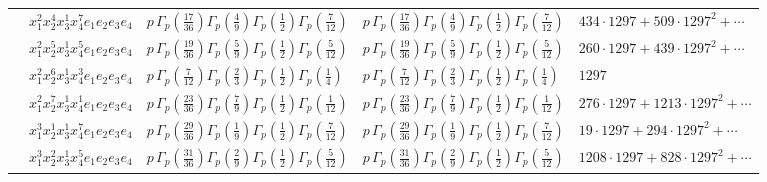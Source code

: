 \documentclass[11pt]{article}
\begin{document}
\begin{table}[ht]
{\begin{tabular}{@{}lllll@{}}
 & $x_{1}^{2} x_{2}^{4} x_{3}^{1} x_{4}^{7}  e_{1} e_{2} e_{3} e_{4}$ & $p \, \Gamma_p \left( \frac{17}{36} \right) \Gamma_p \left( \frac{4}{9} \right) \Gamma_p \left( \frac{1}{2} \right) \Gamma_p \left( \frac{7}{12} \right)$ & $p \, \Gamma_p \left( \frac{17}{36} \right) \Gamma_p \left( \frac{4}{9} \right) \Gamma_p \left( \frac{1}{2} \right) \Gamma_p \left( \frac{7}{12} \right)$ & $434{\cdot}1297{+}509{\cdot}1297^{2}{+}\cdots$ \\
 & $x_{1}^{2} x_{2}^{5} x_{3}^{1} x_{4}^{5}  e_{1} e_{2} e_{3} e_{4}$ & $p \, \Gamma_p \left( \frac{19}{36} \right) \Gamma_p \left( \frac{5}{9} \right) \Gamma_p \left( \frac{1}{2} \right) \Gamma_p \left( \frac{5}{12} \right)$ & $p \, \Gamma_p \left( \frac{19}{36} \right) \Gamma_p \left( \frac{5}{9} \right) \Gamma_p \left( \frac{1}{2} \right) \Gamma_p \left( \frac{5}{12} \right)$ & $260{\cdot}1297{+}439{\cdot}1297^{2}{+}\cdots$ \\
 & $x_{1}^{2} x_{2}^{6} x_{3}^{1} x_{4}^{3}  e_{1} e_{2} e_{3} e_{4}$ & $p \, \Gamma_p \left( \frac{7}{12} \right) \Gamma_p \left( \frac{2}{3} \right) \Gamma_p \left( \frac{1}{2} \right) \Gamma_p \left( \frac{1}{4} \right)$ & $p \, \Gamma_p \left( \frac{7}{12} \right) \Gamma_p \left( \frac{2}{3} \right) \Gamma_p \left( \frac{1}{2} \right) \Gamma_p \left( \frac{1}{4} \right)$ & $1297$ \\
 & $x_{1}^{2} x_{2}^{7} x_{3}^{1} x_{4}^{1}  e_{1} e_{2} e_{3} e_{4}$ & $p \, \Gamma_p \left( \frac{23}{36} \right) \Gamma_p \left( \frac{7}{9} \right) \Gamma_p \left( \frac{1}{2} \right) \Gamma_p \left( \frac{1}{12} \right)$ & $p \, \Gamma_p \left( \frac{23}{36} \right) \Gamma_p \left( \frac{7}{9} \right) \Gamma_p \left( \frac{1}{2} \right) \Gamma_p \left( \frac{1}{12} \right)$ & $276{\cdot}1297{+}1213{\cdot}1297^{2}{+}\cdots$ \\
 & $x_{1}^{3} x_{2}^{1} x_{3}^{1} x_{4}^{7}  e_{1} e_{2} e_{3} e_{4}$ & $p \, \Gamma_p \left( \frac{29}{36} \right) \Gamma_p \left( \frac{1}{9} \right) \Gamma_p \left( \frac{1}{2} \right) \Gamma_p \left( \frac{7}{12} \right)$ & $p \, \Gamma_p \left( \frac{29}{36} \right) \Gamma_p \left( \frac{1}{9} \right) \Gamma_p \left( \frac{1}{2} \right) \Gamma_p \left( \frac{7}{12} \right)$ & $19{\cdot}1297{+}294{\cdot}1297^{2}{+}\cdots$ \\
 & $x_{1}^{3} x_{2}^{2} x_{3}^{1} x_{4}^{5}  e_{1} e_{2} e_{3} e_{4}$ & $p \, \Gamma_p \left( \frac{31}{36} \right) \Gamma_p \left( \frac{2}{9} \right) \Gamma_p \left( \frac{1}{2} \right) \Gamma_p \left( \frac{5}{12} \right)$ & $p \, \Gamma_p \left( \frac{31}{36} \right) \Gamma_p \left( \frac{2}{9} \right) \Gamma_p \left( \frac{1}{2} \right) \Gamma_p \left( \frac{5}{12} \right)$ & $1208{\cdot}1297{+}828{\cdot}1297^{2}{+}\cdots$ \\

\end{tabular}}
\end{table}
\end{document}
